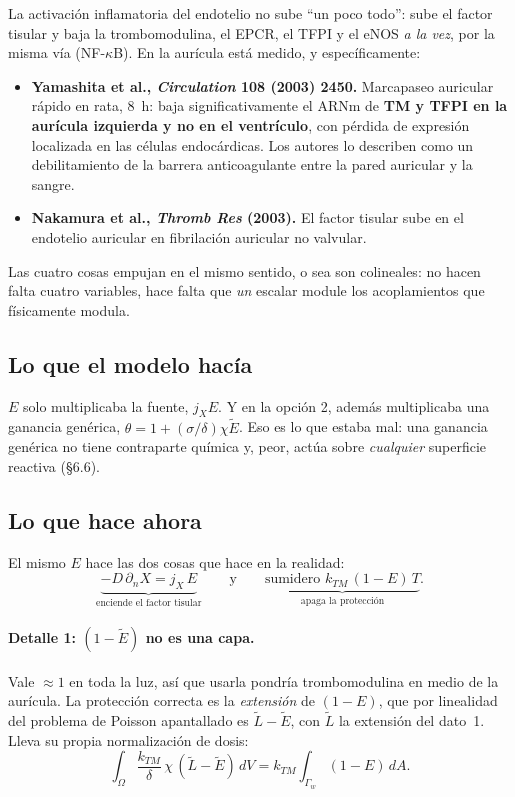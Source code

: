 \documentclass[11pt,a4paper]{article}
\begin{document}
La activación inflamatoria del endotelio no sube ``un poco todo'': sube el factor
tisular y baja la trombomodulina, el EPCR, el TFPI y el eNOS \emph{a la vez}, por la
misma vía (NF-$\kappa$B). En la aurícula está medido, y específicamente:

\begin{itemize}[leftmargin=1.2em,itemsep=2pt]
\item \textbf{Yamashita et al., \emph{Circulation} 108 (2003) 2450.} Marcapaseo
auricular rápido en rata, 8~h: baja significativamente el ARNm de \textbf{TM y
TFPI en la aurícula izquierda y no en el ventrículo}, con pérdida de expresión
localizada en las células endocárdicas. Los autores lo describen como un
debilitamiento de la barrera anticoagulante entre la pared auricular y la sangre.
\item \textbf{Nakamura et al., \emph{Thromb Res} (2003).} El factor tisular sube en
el endotelio auricular en fibrilación auricular no valvular.
\end{itemize}

\noindent
Las cuatro cosas empujan en el mismo sentido, o sea son colineales: no hacen falta
cuatro variables, hace falta que \emph{un} escalar module los acoplamientos que
físicamente modula.

\subsection{Lo que el modelo hacía}

$E$ solo multiplicaba la fuente, $j_X E$. Y en la opción 2, además multiplicaba una
ganancia genérica, $\theta=1+(\sigma/\delta)\chi\tilde E$. Eso es lo que estaba mal:
una ganancia genérica no tiene contraparte química y, peor, actúa sobre
\emph{cualquier} superficie reactiva (§6.6).

\subsection{Lo que hace ahora}

El mismo $E$ hace las dos cosas que hace en la realidad:
%
\begin{equation}
\underbrace{-D\,\partial_n X = j_X\,E}_{\text{enciende el factor tisular}}
\qquad\text{y}\qquad
\underbrace{\text{sumidero } k_{TM}\,(1-E)\,T}_{\text{apaga la protección}} .
\end{equation}

\paragraph{Detalle 1: $(1-\tilde E)$ no es una capa.} Vale $\approx1$ en toda la
luz, así que usarla pondría trombomodulina en medio de la aurícula. La protección
correcta es la \emph{extensión} de $(1-E)$, que por linealidad del problema de
Poisson apantallado es $\tilde L-\tilde E$, con $\tilde L$ la extensión del dato~1.
Lleva su propia normalización de dosis:
%
\begin{equation}
\int_\Omega \frac{k_{TM}}{\delta}\,\chi\,(\tilde L-\tilde E)\,dV
= k_{TM}\int_{\Gamma_w}(1-E)\,dA .
\end{equation}
\end{document}
